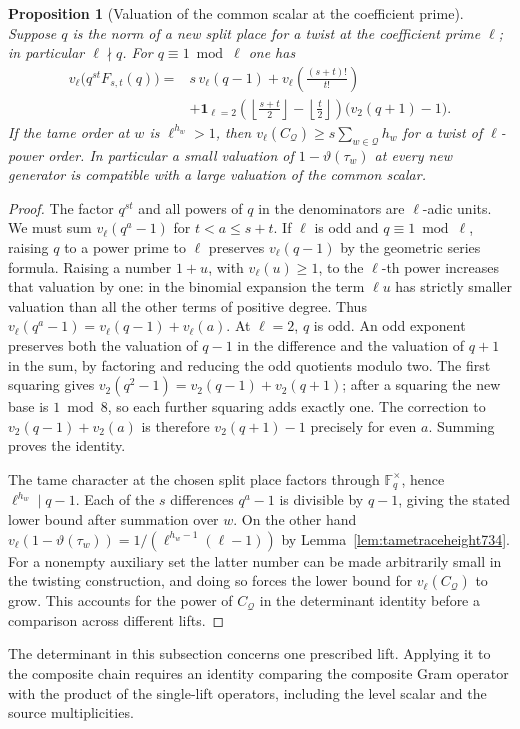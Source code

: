 \documentclass[a4paper,11pt]{article}
\newtheorem{proposition}{Proposition}[section]
\theoremstyle{definition}
\theoremstyle{remark}
\numberwithin{equation}{section}
\begin{document}
\begin{proposition}[Valuation of the common scalar at the coefficient prime]
\leavevmode\label{prop:auxvaluation805}
Suppose \(q\) is the norm of a new split place for a twist
at the coefficient prime \(\ell\); in particular \(\ell\nmid q\).
For \(q\equiv1\bmod\ell\) one has
\[
\begin{split}
 v_\ell\big(q^{st}F_{s,t}(q)\big)
   ={}&s\,v_\ell(q-1)+v_\ell\!\left(\frac{(s+t)!}{t!}\right)\\
   &+\mathbf1_{\ell=2}
       \left(\left\lfloor\frac{s+t}{2}\right\rfloor-
             \left\lfloor\frac{t}{2}\right\rfloor\right)
                          \big(v_2(q+1)-1\big).
\end{split}
\]
If the tame order at \(w\) is \(\ell^{h_w}>1\), then
\(v_\ell(C_{\mathcal Q})\ge s\sum_{w\in\mathcal Q} h_w\)
for a twist of \(\ell\)-power order. In particular a small
valuation of \(1-\vartheta(\tau_w)\) at every new generator
is compatible with a large valuation of the common scalar.
\end{proposition}
\begin{proof}
The factor \(q^{st}\) and all powers of \(q\) in the denominators
are \(\ell\)-adic units. We must sum \(v_\ell(q^a-1)\) for
\(t<a\le s+t\). If \(\ell\) is odd and \(q\equiv1\bmod\ell\),
raising \(q\) to a power prime to \(\ell\) preserves
\(v_\ell(q-1)\) by the geometric series formula. Raising a
number \(1+u\), with \(v_\ell(u)\ge1\), to the \(\ell\)-th
power increases that valuation by one: in the binomial
expansion the term \(\ell u\) has strictly smaller valuation
than all the other terms of positive degree. Thus
\(v_\ell(q^a-1)=v_\ell(q-1)+v_\ell(a)\).
At \(\ell=2\), \(q\) is odd. An odd exponent preserves both
the valuation of \(q-1\) in the difference and the valuation
of \(q+1\) in the sum, by factoring and reducing the odd
quotients modulo two. The first squaring gives
\(v_2(q^2-1)=v_2(q-1)+v_2(q+1)\); after a squaring the new
base is \(1\bmod 8\), so each further squaring adds exactly
one. The correction to \(v_2(q-1)+v_2(a)\) is therefore
\(v_2(q+1)-1\) precisely for even \(a\). Summing proves the
identity.

The tame character at the chosen split place factors through
\(\mathbb F_q^\times\), hence \(\ell^{h_w}\mid q-1\). Each
of the \(s\) differences \(q^a-1\) is divisible by \(q-1\),
giving the stated lower bound after summation over \(w\).
On the other hand
\(v_\ell(1-\vartheta(\tau_w))=1/(\ell^{h_w-1}(\ell-1))\)
by Lemma~\ref{lem:tametraceheight734}. For a nonempty auxiliary
set the latter number can be made arbitrarily small in the
twisting construction, and doing so forces the lower bound for
\(v_\ell(C_{\mathcal Q})\) to grow. This accounts for the power
of \(C_{\mathcal Q}\) in the determinant identity before a
comparison across different lifts.
\end{proof}
The determinant in this subsection concerns one prescribed lift.
Applying it to the composite chain requires an identity comparing
the composite Gram operator with the product of the single-lift
operators, including the level scalar and the source multiplicities.
\clearpage
\end{document}
